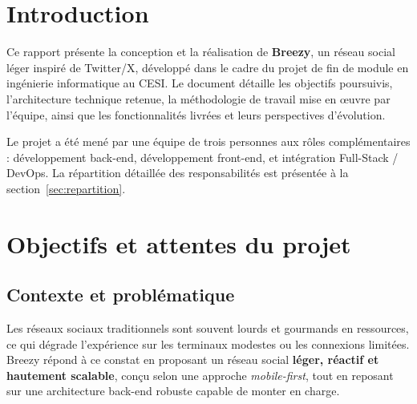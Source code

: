 

\section*{Introduction}

Ce rapport présente la conception et la réalisation de \textbf{Breezy}, un réseau
social léger inspiré de Twitter/X, développé dans le cadre du projet de fin de
module en ingénierie informatique au CESI. Le document détaille les objectifs
poursuivis, l'architecture technique retenue, la méthodologie de travail mise en
œuvre par l'équipe, ainsi que les fonctionnalités livrées et leurs perspectives
d'évolution.

Le projet a été mené par une équipe de trois personnes aux rôles
complémentaires : développement back-end, développement front-end, et
intégration Full-Stack / DevOps. La répartition détaillée des responsabilités
est présentée à la section~\ref{sec:repartition}.


\newpage

\section{Objectifs et attentes du projet}

\subsection{Contexte et problématique}

Les réseaux sociaux traditionnels sont souvent lourds et gourmands en ressources,
ce qui dégrade l'expérience sur les terminaux modestes ou les connexions limitées.
Breezy répond à ce constat en proposant un réseau social \textbf{léger, réactif et
hautement scalable}, conçu selon une approche \textit{mobile-first}, tout en
reposant sur une architecture back-end robuste capable de monter en charge.


